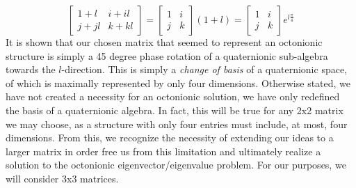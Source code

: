 \documentclass{article}
\theoremstyle{plain}
\begin{document}
$$
\begin{bmatrix}1+l & i+il\\j+jl & k+kl\end{bmatrix}
=
\begin{bmatrix}1 & i\\j & k\end{bmatrix}(1+l)
=
\begin{bmatrix}1 & i\\j & k\end{bmatrix}e^{l\frac{\pi}{4}}
$$
It is shown that our chosen matrix that seemed to represent an octonionic structure is simply a 45 degree phase rotation of a quaternionic sub-algebra towards the $l$-direction. This is simply a \emph{change of basis} of a quaternionic space, of which is maximally represented by only four dimensions. Otherwise stated, we have not created a necessity for an octonionic solution, we have only redefined the basis of a quaternionic algebra. In fact, this will be true for any 2x2 matrix we may choose, as a structure with only four entries must include, at most, four dimensions. From this, we recognize the necessity of extending our ideas to a larger matrix in order free us from this limitation and ultimately realize a solution to the octonionic eigenvector/eigenvalue problem. For our purposes, we will consider 3x3 matrices.

\end{document}
